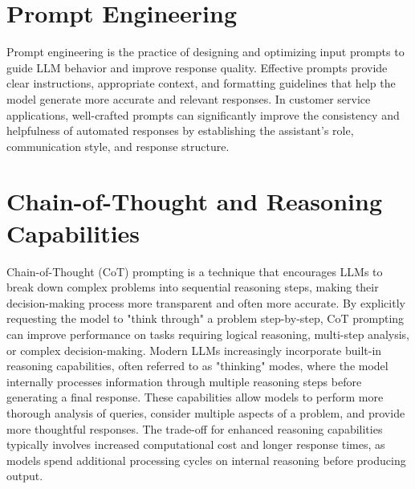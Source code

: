 \section{Prompt Engineering}
\label{sec:prompt-engineering}

Prompt engineering is the practice of designing and optimizing input prompts to guide LLM behavior and improve response quality.
Effective prompts provide clear instructions, appropriate context, and formatting guidelines that help the model generate more accurate and relevant responses.
In customer service applications, well-crafted prompts can significantly improve the consistency and helpfulness of automated responses by establishing the assistant's role, communication style, and response structure.

\section{Chain-of-Thought and Reasoning Capabilities}
\label{sec:thinking}

Chain-of-Thought (CoT) prompting is a technique that encourages LLMs to break down complex problems into sequential reasoning steps, making their decision-making process more transparent and often more accurate.
By explicitly requesting the model to "think through" a problem step-by-step, CoT prompting can improve performance on tasks requiring logical reasoning, multi-step analysis, or complex decision-making.
Modern LLMs increasingly incorporate built-in reasoning capabilities, often referred to as "thinking" modes, where the model internally processes information through multiple reasoning steps before generating a final response.
These capabilities allow models to perform more thorough analysis of queries, consider multiple aspects of a problem, and provide more thoughtful responses.
The trade-off for enhanced reasoning capabilities typically involves increased computational cost and longer response times, as models spend additional processing cycles on internal reasoning before producing output.
